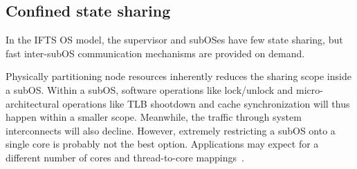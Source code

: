 \documentclass[pageno]{jpaper}
\begin{document}
\subsection{Confined state sharing}\label{subsubsection_state_sharing}




In the IFTS OS model, the supervisor and subOSes have few state sharing, but  fast inter-subOS communication mechanisms are provided
   on demand.






Physically partitioning node resources inherently reduces the sharing scope  inside a subOS. Within a subOS, software operations like lock/unlock and micro-architectural operations like TLB shootdown and cache synchronization will thus happen within a smaller scope. Meanwhile, the traffic through system interconnects will also decline. However, extremely restricting a subOS onto a single core is probably not the best option. Applications may expect for a different number of cores and thread-to-core mappings~\cite{Tang:2011:IMS}.
\end{document}
